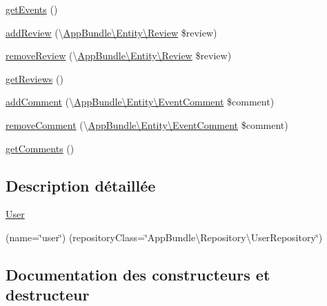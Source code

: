 \begin{DoxyCompactItemize}
\item 
\hyperlink{classAppBundle_1_1Entity_1_1User_a62fde34b4402150a87ac4fd1e2cd5131}{get\+Events} ()
\item 
\hyperlink{classAppBundle_1_1Entity_1_1User_a4fa2fe6e700686a54540db892955f6dc}{add\+Review} (\textbackslash{}\hyperlink{classAppBundle_1_1Entity_1_1Review}{App\+Bundle\textbackslash{}\+Entity\textbackslash{}\+Review} \$review)
\item 
\hyperlink{classAppBundle_1_1Entity_1_1User_aed23331dfb185937f4ba5330bd70f9b5}{remove\+Review} (\textbackslash{}\hyperlink{classAppBundle_1_1Entity_1_1Review}{App\+Bundle\textbackslash{}\+Entity\textbackslash{}\+Review} \$review)
\item 
\hyperlink{classAppBundle_1_1Entity_1_1User_a29c6f462a5c30617e4f698a546ebd01c}{get\+Reviews} ()
\item 
\hyperlink{classAppBundle_1_1Entity_1_1User_a3368f692f4cbd77041ae379ea82d7d8e}{add\+Comment} (\textbackslash{}\hyperlink{classAppBundle_1_1Entity_1_1EventComment}{App\+Bundle\textbackslash{}\+Entity\textbackslash{}\+Event\+Comment} \$comment)
\item 
\hyperlink{classAppBundle_1_1Entity_1_1User_ad339056b59c0cb14cf5707ffd91a44a3}{remove\+Comment} (\textbackslash{}\hyperlink{classAppBundle_1_1Entity_1_1EventComment}{App\+Bundle\textbackslash{}\+Entity\textbackslash{}\+Event\+Comment} \$comment)
\item 
\hyperlink{classAppBundle_1_1Entity_1_1User_a8fbe81b221f53f304670755352cd470c}{get\+Comments} ()
\end{DoxyCompactItemize}


\subsection{Description détaillée}
\hyperlink{classAppBundle_1_1Entity_1_1User}{User}

(name=\char`\"{}user\char`\"{}) (repository\+Class=\char`\"{}\+App\+Bundle\textbackslash{}\+Repository\textbackslash{}\+User\+Repository\char`\"{}) 

\subsection{Documentation des constructeurs et destructeur}
\mbox{\label{classAppBundle_1_1Entity_1_1User_a3e00ef768aa0cac041abfda0d164bfcb}} 
